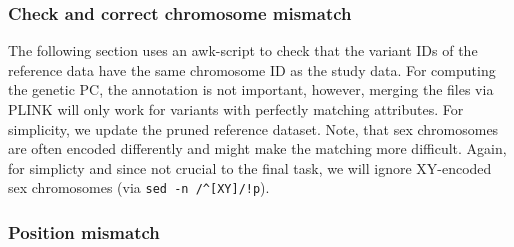 \documentclass[]{article}
\newenvironment{Shaded}{}{}
\newcommand{\KeywordTok}[1]{\textcolor[rgb]{0.00,0.44,0.13}{\textbf{#1}}}
\newcommand{\StringTok}[1]{\textcolor[rgb]{0.25,0.44,0.63}{#1}}
\newcommand{\FunctionTok}[1]{\textcolor[rgb]{0.02,0.16,0.49}{#1}}
\newcommand{\VariableTok}[1]{\textcolor[rgb]{0.10,0.09,0.49}{#1}}
\newcommand{\OperatorTok}[1]{\textcolor[rgb]{0.40,0.40,0.40}{#1}}
\newcommand{\ExtensionTok}[1]{#1}
\newcommand{\NormalTok}[1]{#1}
\begin{document}
\subsubsection{Check and correct chromosome
mismatch}\label{check-and-correct-chromosome-mismatch}

The following section uses an awk-script to check that the variant IDs
of the reference data have the same chromosome ID as the study data. For
computing the genetic PC, the annotation is not important, however,
merging the files via PLINK will only work for variants with perfectly
matching attributes. For simplicity, we update the pruned reference
dataset. Note, that sex chromosomes are often encoded differently and
might make the matching more difficult. Again, for simplicty and since
not crucial to the final task, we will ignore XY-encoded sex chromosomes
(via
\texttt{sed\ -n\ \textquotesingle{}/\^{}{[}XY{]}/!p\textquotesingle{}}).

\begin{Shaded}
\end{Shaded}

\subsubsection{Position mismatch}\label{position-mismatch}
\end{document}
